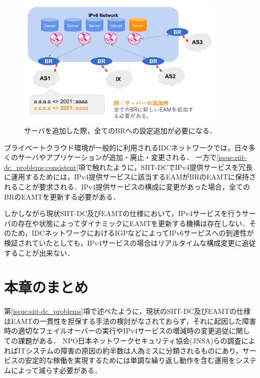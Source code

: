 \begin{figure}[h]
    \begin{center}
      \includegraphics[width=10cm,pagebox=cropbox,clip]{img/siit-dc_add-server.png}
    \end{center}
    \caption{サーバを追加した際，全てのBRへの設定追加が必要になる．}
    \label{fig:siit-dc_add-server}
\end{figure}

プライベートクラウド環境が一般的に利用されるIDCネットワークでは，日々多くのサーバやアプリケーションが追加・廃止・変更される．
一方で\ref{issue:siit-dc_problems:consistent}項で触れたように，SIIT-DCでIPv4提供サービスを冗長に運用するためには，IPv4提供サービスに該当するEAMがBRのEAMTに保持されることが要求される．IPv4提供サービスの構成に変更があった場合，全てのBRのEAMTを更新する必要がある．

しかしながら現状SIIT-DC及びEAMTの仕様\cite{RFC7755,RFC7756,RFC7757}において，IPv4サービスを行うサーバの存在や状態によってダイナミックにEAMTを更新する機構は存在しない．そのため，IDCネットワークにおけるIGPなどによってIPv6サービスへの到達性が検証されていたとしても，IPv4サービスの場合はリアルタイムな構成変更に追従することが出来ない．


\section{本章のまとめ}
第\ref{issue:siit-dc_problems}項で述べたように，現状のSIIT-DC及びEAMTの仕様はEAMTの一貫性を担保する手法の検討がなされておらず，それに起因した障害時の適切なフェイルオーバーの実行やIPv4サービスの増減時の変更追従に関しての課題がある．
NPO日本ネットワークセキュリティ協会(JNSA)らの調査によればITシステムの障害の原因の約半数は人為ミスに分類されるものにあり\cite{human_error}，サービスの安定的な稼働を実現するためには単調な繰り返し動作を含む運用をシステムによって減らす必要がある．


